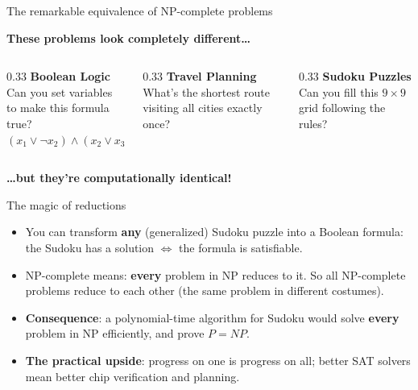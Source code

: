 \ifdefined\PRESENTATION\else\PassOptionsToClass{handout}{beamer}\fi\documentclass[aspectratio=169, lualatex]{beamer}
\begin{document}
\begin{frame}{The remarkable equivalence of NP-complete problems}
	\begin{center}
		\Large\textbf{These problems look completely different\ldots}
		\vspace{0.5cm}

		\begin{columns}[c]
			\begin{column}{0.33\textwidth}
				\textbf{Boolean Logic}\\
				\small Can you set variables to make this formula true?\\
				$(x_1 \lor \neg x_2) \land (x_2 \lor x_3) \land \ldots$
			\end{column}
			\begin{column}{0.33\textwidth}
				\textbf{Travel Planning}\\
				\small What's the shortest route visiting all cities exactly once?
			\end{column}
			\begin{column}{0.33\textwidth}
				\textbf{Sudoku Puzzles}\\
				\small Can you fill this $9 \times 9$ grid following the rules?
			\end{column}
		\end{columns}
		\vspace{0.5cm}

		\Large\textbf{\ldots but they're computationally identical!}
	\end{center}
\end{frame}

\begin{frame}{The magic of reductions}
	\begin{itemize}[<+->]
		\item You can transform \textbf{any} (generalized) Sudoku puzzle into a Boolean formula: the Sudoku has a solution $\Leftrightarrow$ the formula is satisfiable.
		\item NP-complete means: \textbf{every} problem in NP reduces to it. So all NP-complete problems reduce to each other (the same problem in different costumes).
		\item \textbf{Consequence}: a polynomial-time algorithm for Sudoku would solve \textbf{every} problem in NP efficiently, and prove $P = NP$.
		\item \textbf{The practical upside}: progress on one is progress on all; better SAT solvers mean better chip verification and planning.
	\end{itemize}
\end{frame}
\end{document}
